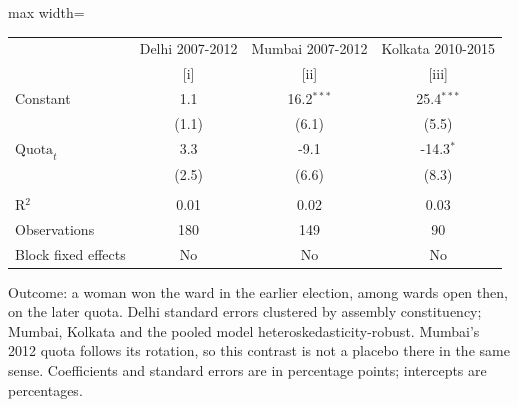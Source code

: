 
\begingroup
\centering
\scriptsize
\begin{adjustbox}{max width=\linewidth}
   \begin{threeparttable}[b]
      \begin{tabular}{lccc}
         \toprule
                             & Delhi 2007-2012 & Mumbai 2007-2012 & Kolkata 2010-2015 \\
                             & [i]             & [ii]             & [iii]\\
         \midrule
         Constant            & 1.1             & 16.2$^{***}$     & 25.4$^{***}$\\
                             & (1.1)           & (6.1)            & (5.5)\\
         $\text{Quota}_{t}$  & 3.3             & -9.1             & -14.3$^{*}$\\
                             & (2.5)           & (6.6)            & (8.3)\\
          \\
         R$^2$               & 0.01            & 0.02             & 0.03\\
         Observations        & 180             & 149              & 90\\
         Block fixed effects & No              & No               & No\\
         \bottomrule
      \end{tabular}

      \begin{tablenotes}
         \item Outcome: a woman won the ward in the earlier election, among wards open then, on the later quota. Delhi standard errors clustered by assembly constituency; Mumbai, Kolkata and the pooled model heteroskedasticity-robust. Mumbai's 2012 quota follows its rotation, so this contrast is not a placebo there in the same sense. Coefficients and standard errors are in percentage points; intercepts are percentages.
      \end{tablenotes}
   \end{threeparttable}
\end{adjustbox}
\par\endgroup


